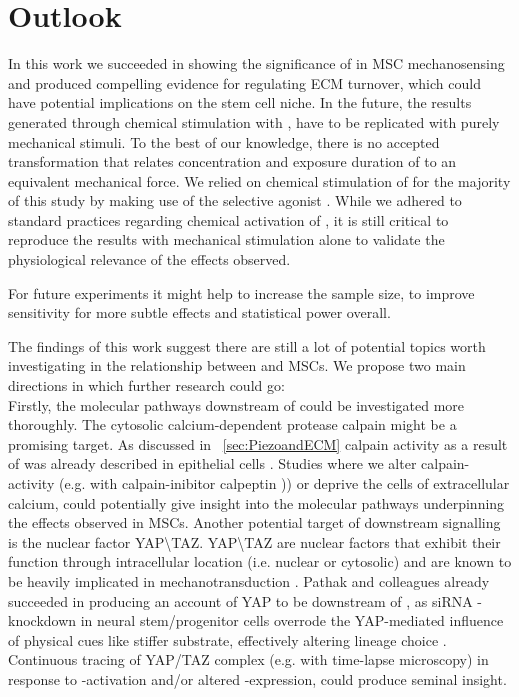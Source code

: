 \chapter{Outlook}
In this work we succeeded in showing the significance of \Piezo{} in MSC mechanosensing and produced compelling evidence for \Piezo{} regulating ECM turnover, which could have potential implications on the stem cell niche.
In the future, the results generated through chemical stimulation with \Yoda{}, have to be replicated with purely mechanical stimuli. To the best of our knowledge, there is no accepted transformation that relates concentration and exposure duration of \Yoda{} to an equivalent mechanical force. We relied on chemical stimulation of \Piezo{} for the majority of this study by making use of the selective \Piezo{} agonist \Yoda{}. While we adhered to standard practices regarding chemical activation of \Piezo{}\cite{Morley2018}, it is still critical to reproduce the results with mechanical stimulation alone to validate the physiological relevance of the effects observed. \par

For future experiments it might help to increase the sample size, to improve sensitivity for more subtle effects and statistical power overall. \par

The findings of this work suggest there are still a lot of potential topics worth investigating in the relationship between \Piezo{} and MSCs. We propose two main directions in which further research could go:\\
Firstly, the molecular pathways downstream of \Piezo{} could be investigated more thoroughly. The cytosolic calcium-dependent protease calpain might be a promising target. As discussed in ~\vref{sec:PiezoandECM} calpain activity as a result of \Piezo{} was already described in epithelial cells \cite{McHugh2010}. Studies where we alter calpain-activity (e.g. with calpain-inibitor calpeptin \cite{Schoenwaelder1999})) or deprive the cells of extracellular calcium, could potentially give insight into the molecular pathways underpinning the effects observed in MSCs. Another potential target of \Piezo{} downstream signalling is the nuclear factor YAP\textbackslash{}TAZ. YAP\textbackslash{}TAZ are nuclear factors that exhibit their function through intracellular location (i.e. nuclear or cytosolic) and are known to be heavily implicated in mechanotransduction \cite{Dupont2011}. Pathak and colleagues already succeeded in producing an account of YAP to be downstream of \Piezo{}, as siRNA \Piezo{}-knockdown in neural stem/progenitor cells overrode the YAP-mediated influence of physical cues like stiffer substrate, effectively altering lineage choice \cite{Pathak2014}. Continuous tracing of YAP/TAZ complex (e.g. with time-lapse microscopy) in response to \Yoda{}-activation and/or altered \Piezo{}-expression, could produce seminal insight.\par

